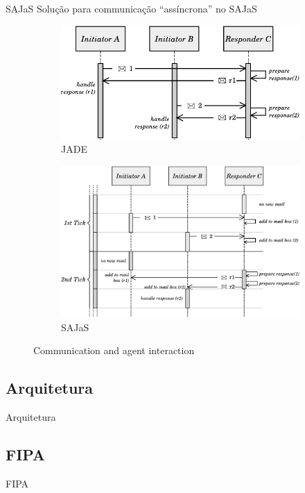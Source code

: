 \begin{frame}{SAJaS}
	Solução para communicação ``assíncrona'' no SAJaS
	\begin{figure}
		\centering
	    \begin{subfigure}[b]{0.45\linewidth}
			\centering
			\includegraphics[width=\linewidth]{../figures/tickExample2.pdf}
			\caption{JADE}
			\label{fig:com-example-jade}
	    \end{subfigure}
	    \begin{subfigure}[b]{0.45\linewidth}
			\centering
			\includegraphics[width=\linewidth]{../figures/tickExample.pdf}
			\caption{SAJaS}
			\label{fig:com-example-repast}
	    \end{subfigure}
	    \caption{Communication and agent interaction}
	    \label{fig:execution_example}
	\end{figure}

\end{frame}

\subsection{Arquitetura}
\begin{frame}{Arquitetura}

\end{frame}

\subsection{FIPA}
\begin{frame}{FIPA}

\end{frame}